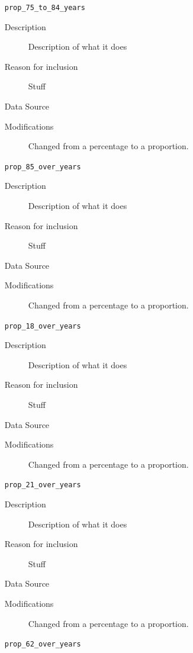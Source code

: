 \documentclass{article}
\begin{document}
\begin{itemize}[label={}, align=left]
    \item[\texttt{prop\_75\_to\_84\_years}] \
          \begin{description}
              \item[Description] Description of what it does
              \item[Reason for inclusion] Stuff
              \item[Data Source] \cite{acs_demographics_data}
              \item[Modifications] Changed from a percentage to a proportion.
          \end{description}
    \item[\texttt{prop\_85\_over\_years}] \
          \begin{description}
              \item[Description] Description of what it does
              \item[Reason for inclusion] Stuff
              \item[Data Source] \cite{acs_demographics_data}
              \item[Modifications] Changed from a percentage to a proportion.
          \end{description}
    \item[\texttt{prop\_18\_over\_years}] \
          \begin{description}
              \item[Description] Description of what it does
              \item[Reason for inclusion] Stuff
              \item[Data Source] \cite{acs_demographics_data}
              \item[Modifications] Changed from a percentage to a proportion.
          \end{description}
    \item[\texttt{prop\_21\_over\_years}] \
          \begin{description}
              \item[Description] Description of what it does
              \item[Reason for inclusion] Stuff
              \item[Data Source] \cite{acs_demographics_data}
              \item[Modifications] Changed from a percentage to a proportion.
          \end{description}
    \item[\texttt{prop\_62\_over\_years}] \

\end{itemize}
\end{document}
